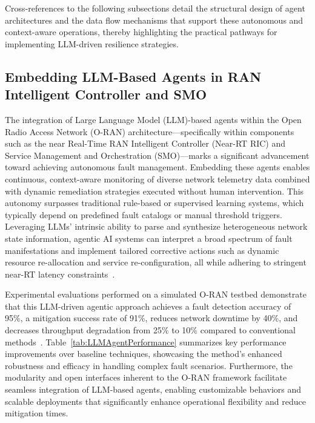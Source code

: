 \documentclass[sigconf]{acmart}
\begin{document}
Cross-references to the following subsections detail the structural design of agent architectures and the data flow mechanisms that support these autonomous and context-aware operations, thereby highlighting the practical pathways for implementing LLM-driven resilience strategies.

\subsection{Embedding LLM-Based Agents in RAN Intelligent Controller and SMO}

The integration of Large Language Model (LLM)-based agents within the Open Radio Access Network (O-RAN) architecture—specifically within components such as the near Real-Time RAN Intelligent Controller (Near-RT RIC) and Service Management and Orchestration (SMO)—marks a significant advancement toward achieving autonomous fault management. Embedding these agents enables continuous, context-aware monitoring of diverse network telemetry data combined with dynamic remediation strategies executed without human intervention. This autonomy surpasses traditional rule-based or supervised learning systems, which typically depend on predefined fault catalogs or manual threshold triggers. Leveraging LLMs’ intrinsic ability to parse and synthesize heterogeneous network state information, agentic AI systems can interpret a broad spectrum of fault manifestations and implement tailored corrective actions such as dynamic resource re-allocation and service re-configuration, all while adhering to stringent near-RT latency constraints~\cite{ref55}.

Experimental evaluations performed on a simulated O-RAN testbed demonstrate that this LLM-driven agentic approach achieves a fault detection accuracy of 95\%, a mitigation success rate of 91\%, reduces network downtime by 40\%, and decreases throughput degradation from 25\% to 10\% compared to conventional methods~\cite{ref55}. Table~\ref{tab:LLMAgentPerformance} summarizes key performance improvements over baseline techniques, showcasing the method’s enhanced robustness and efficacy in handling complex fault scenarios. Furthermore, the modularity and open interfaces inherent to the O-RAN framework facilitate seamless integration of LLM-based agents, enabling customizable behaviors and scalable deployments that significantly enhance operational flexibility and reduce mitigation times.
\end{document}
